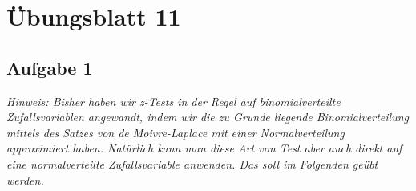 \chapter{Übungsblatt 11}

\section{Aufgabe 1}

\textit{Hinweis: Bisher haben wir z-Tests in der Regel auf binomialverteilte Zufallsvariablen
    angewandt, indem wir die zu Grunde liegende Binomialverteilung mittels des Satzes von de
    Moivre-Laplace mit einer Normalverteilung approximiert haben. Natürlich kann man diese Art
    von Test aber auch direkt auf eine normalverteilte Zufallsvariable anwenden. Das soll im
    Folgenden geübt werden.}